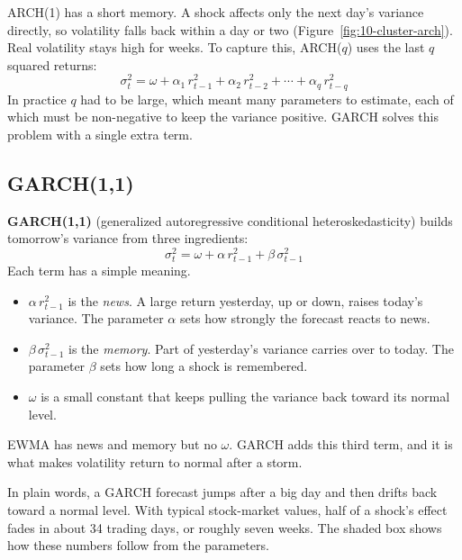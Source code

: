 ARCH(1) has a short memory. A shock affects only the next day's variance directly, so volatility falls back within a day or two (Figure~\ref{fig:10-cluster-arch}). Real volatility stays high for weeks. To capture this, ARCH($q$) uses the last $q$ squared returns:
\begin{equation}
  \sigma^2_t = \omega + \alpha_1\,r^2_{t-1} + \alpha_2\,r^2_{t-2} + \cdots + \alpha_q\,r^2_{t-q}
  \label{eq:10-archq}
\end{equation}
In practice $q$ had to be large, which meant many parameters to estimate, each of which must be non-negative to keep the variance positive. GARCH solves this problem with a single extra term.


\subsection{GARCH(1,1)}
\label{sec:10-garch}

\textbf{GARCH(1,1)} (generalized autoregressive conditional heteroskedasticity) builds tomorrow's variance from three ingredients:
\begin{equation}
  \sigma^2_t = \omega + \alpha\,r^2_{t-1} + \beta\,\sigma^2_{t-1}
  \label{eq:10-garch}
\end{equation}
Each term has a simple meaning.
\begin{itemize}
  \item $\alpha\,r^2_{t-1}$ is the \emph{news}. A large return yesterday, up or down, raises today's variance. The parameter $\alpha$ sets how strongly the forecast reacts to news.
  \item $\beta\,\sigma^2_{t-1}$ is the \emph{memory}. Part of yesterday's variance carries over to today. The parameter $\beta$ sets how long a shock is remembered.
  \item $\omega$ is a small constant that keeps pulling the variance back toward its normal level.
\end{itemize}
EWMA has news and memory but no $\omega$. GARCH adds this third term, and it is what makes volatility return to normal after a storm.

In plain words, a GARCH forecast jumps after a big day and then drifts back toward a normal level. With typical stock-market values, half of a shock's effect fades in about 34 trading days, or roughly seven weeks. The shaded box shows how these numbers follow from the parameters.

